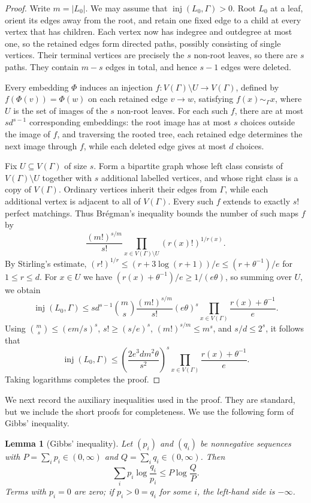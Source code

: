 \documentclass[reqno,final,a4paper]{amsart}
\numberwithin{equation}{section}
\newtheorem{lemma}[theorem]{Lemma}
\theoremstyle{definition}
\theoremstyle{remark}
\DeclareMathOperator{\inj}{inj}
\begin{document}
\begin{proof}
Write $m=|L_0|$.  We may assume that $\inj(L_0,\Gamma)>0$. Root $L_0$ at a leaf, orient its edges away
from the root, and retain one fixed edge to a child at every vertex that has children. Each vertex now has indegree and outdegree at most one, so the retained edges form directed paths,
possibly consisting of single vertices. Their terminal vertices are precisely the $s$ non-root leaves, so there are $s$ paths. They contain $m-s$ edges in total, and hence $s-1$ edges were deleted.

Every embedding $\Phi$ induces an injection
$f:V(\Gamma)\setminus U\to V(\Gamma)$, defined by
$f(\Phi(v))=\Phi(w)$ on each retained edge $v\to w$,
satisfying $f(x)\sim_\Gamma x$, where $U$ is the set of images
of the $s$ non-root leaves. For each such $f$, there are at
most $sd^{s-1}$ corresponding embeddings: the root image has at most $s$ choices outside the image of $f$, and traversing the rooted tree, each retained edge determines the next image through $f$, while each deleted edge gives at most $d$ choices.

Fix $U\subseteq V(\Gamma)$ of size $s$. Form a bipartite
graph whose left class consists of $V(\Gamma)\setminus U$ together with
$s$ additional labelled vertices, and whose right class is a copy of $V(\Gamma)$. Ordinary vertices inherit their edges from
$\Gamma$, while each additional vertex is adjacent to all of
$V(\Gamma)$. Every such $f$ extends to exactly $s!$ perfect
matchings. Thus Br\'egman's inequality bounds the number
of such maps $f$ by
\[
 \frac{(m!)^{s/m}}{s!}
 \prod_{x\in V(\Gamma)\setminus U}(r(x)!)^{1/r(x)}.
\]
By Stirling's estimate,
$(r!)^{1/r}\le(r+3\log(r+1))/e
\le(r+\theta^{-1})/e$ for $1\le r\le d$.
For $x\in U$ we have
$(r(x)+\theta^{-1})/e\ge 1/(e\theta)$,
so summing over $U$, we obtain
\[
 \inj(L_0,\Gamma)
 \le sd^{s-1}\binom ms\frac{(m!)^{s/m}}{s!}
 (e\theta)^s
 \prod_{x\in V(\Gamma)}\frac{r(x)+\theta^{-1}}{e}.
\]
Using $\binom ms\le(em/s)^s$, $s!\ge(s/e)^s$,
$(m!)^{s/m}\le m^s$, and $s/d\le2^s$, it follows that
\[
 \inj(L_0,\Gamma)
 \le \left(\frac{2e^3dm^2\theta}{s^2}\right)^s
 \prod_{x\in V(\Gamma)}\frac{r(x)+\theta^{-1}}{e}.
\]
Taking logarithms completes the proof.
\end{proof}

We next record the auxiliary inequalities used in the proof. They are standard, but we include the short proofs for completeness. We use the following form of Gibbs' inequality.

\begin{lemma}[Gibbs' inequality]\label{lem:gibbs}
Let $(p_i)$ and $(q_i)$ be nonnegative sequences with
$P=\sum_i p_i\in(0,\infty)$ and
$Q=\sum_i q_i\in(0,\infty)$. Then
\[
    \sum_i p_i\log\frac{q_i}{p_i}
    \le P\log\frac{Q}{P}.
\]
Terms with $p_i=0$ are zero; if $p_i>0=q_i$ for some $i$,
the left-hand side is $-\infty$.
\end{lemma}
\end{document}
